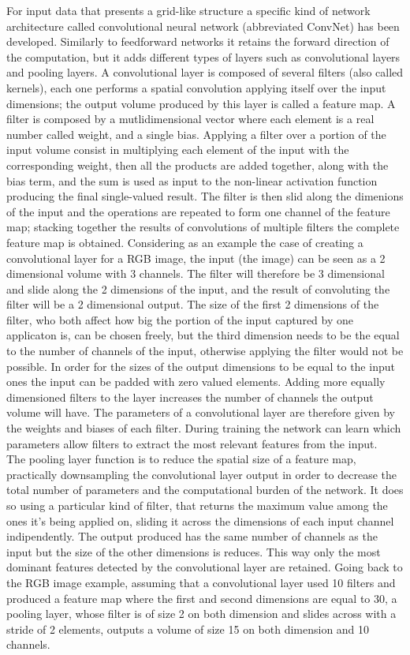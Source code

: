 \documentclass[12pt]{article}
\begin{document}
For input data that presents a grid-like structure a specific kind of network architecture called convolutional neural network (abbreviated ConvNet) has been developed. Similarly to feedforward networks it retains the forward direction of the computation, but it adds different types of layers such as convolutional layers and pooling layers. A convolutional layer is composed of several filters (also called kernels), each one performs a spatial convolution applying itself over the input dimensions; the output volume produced by this layer is called a feature map.
A filter is composed by a mutlidimensional vector where each element is a real number called weight, and a single bias. Applying a filter over a portion of the input volume consist in multiplying each element of the input with the corresponding  weight, then all the products are added together, along with the bias term, and the sum is used as input to the non-linear activation function producing the final single-valued result. The filter is then slid along the dimenions of the input and the operations are repeated to form one channel of the feature map; stacking together the results of convolutions of multiple filters the complete feature map is obtained. Considering as an example the case of creating a convolutional layer for a RGB image, the input (the image) can be seen as a 2 dimensional volume with 3 channels. The filter will therefore be 3 dimensional and slide along the 2 dimensions of the input, and the result of convoluting the filter will be a 2 dimensional output. The size of the first 2 dimensions of the filter, who both affect how big the portion of the input captured by one applicaton is, can be chosen freely, but the third dimension needs to be the equal to the number of channels of the input, otherwise applying the filter would not be possible. In order for the sizes of the output dimensions to be equal to the input ones the input can be padded with zero valued elements. Adding more equally dimensioned filters to the layer increases the number of channels the output volume will have. The parameters of a convolutional layer are therefore given by the weights and biases of each filter. During training the network can learn which parameters allow filters to extract the most relevant features from the input.\\
The pooling layer function is to reduce the spatial size of a feature map, practically downsampling the convolutional layer output in order to decrease the total number of parameters and the computational burden of the network. It does so using a particular kind of filter, that returns the maximum value among the ones it's being applied on, sliding it across the dimensions of each input channel indipendently. The output produced has the same number of channels as the input but the size of the other dimensions is reduces. This way only the most dominant features detected by the convolutional layer are retained. Going back to the RGB image example, assuming that a convolutional layer used 10 filters and produced a feature map where the first and second dimensions are equal to 30, a pooling layer, whose filter is of size 2 on both dimension and slides across with a stride of 2 elements, outputs a volume of size 15 on both dimension and 10 channels.\\
\end{document}

